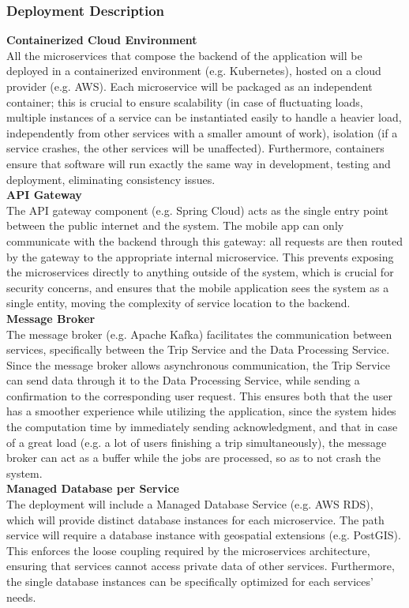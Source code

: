 \subsubsection{Deployment Description}
\textbf{Containerized Cloud Environment}\\
All the microservices that compose the backend of the application will be deployed in a containerized environment (e.g. Kubernetes), hosted on a cloud provider (e.g. AWS). Each microservice will be packaged as an independent container; this is crucial to ensure scalability (in case of fluctuating loads, multiple instances of a service can be instantiated easily to handle a heavier load, independently from other services with a smaller amount of work), isolation (if a service crashes, the other services will be unaffected). Furthermore, containers ensure that software will run exactly the same way in development, testing and deployment, eliminating consistency issues.\\
\newline
\textbf{API Gateway}\\
The API gateway component (e.g. Spring Cloud) acts as the single entry point between the public internet and the system. The mobile app can only communicate with the backend through this gateway: all requests are then routed by the gateway to the appropriate internal microservice. This prevents exposing the microservices directly to anything outside of the system, which is crucial for security concerns, and ensures that the mobile application sees the system as a single entity, moving the complexity of service location to the backend.\\
\newline
\textbf{Message Broker}\\
The message broker (e.g. Apache Kafka) facilitates the communication between services, specifically between the Trip Service and the Data Processing Service. Since the message broker allows asynchronous communication, the Trip Service can send data through it to the Data Processing Service, while sending a confirmation to the corresponding user request. This ensures both that the user has a smoother experience while utilizing the application, since the system hides the computation time by immediately sending acknowledgment, and that in case of a great load (e.g. a lot of users finishing a trip simultaneously), the message broker can act as a buffer while the jobs are processed, so as to not crash the system.\\
\newline
\textbf{Managed Database per Service}\\
The deployment will include a Managed Database Service (e.g. AWS RDS), which will provide distinct database instances for each microservice. The path service will require a database instance with geospatial extensions (e.g. PostGIS).
This enforces the loose coupling required by the microservices architecture, ensuring that services cannot access private data of other services. Furthermore, the single database instances can be specifically optimized for each services’ needs.
\newpage
